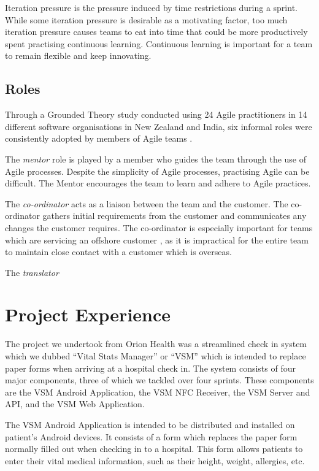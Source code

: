 \documentclass[conference]{IEEEtran}
\begin{document}
Iteration pressure is the pressure induced by time restrictions during a sprint.
While some iteration pressure is desirable as a motivating factor, too much
iteration pressure causes teams to eat into time that could be more productively
spent practising continuous learning. Continuous learning is important for a
team to remain flexible and keep innovating.

\subsection{Roles}

Through a Grounded Theory \cite{strauss1994grounded} study conducted using 24
Agile practitioners in 14 different software organisations in New Zealand and
India, six informal roles were consistently adopted by members of Agile teams
\cite{hoda2010organizing}.

The \emph{mentor} role is played by a member who guides the team through the use
of Agile processes. Despite the simplicity of Agile processes, practising Agile
can be difficult. The Mentor encourages the team to learn and adhere to Agile
practices.

The \emph{co-ordinator} acts as a liaison between the team and the customer. The
co-ordinator gathers initial requirements from the customer and communicates any
changes the customer requires. The co-ordinator is especially important for
teams which are servicing an offshore customer \cite{hoda2010organizing}, as it
is impractical for the entire team to maintain close contact with a customer
which is overseas.

The \emph{translator}



\section{Project Experience}

The project we undertook from Orion Health was a streamlined check in system
which we dubbed ``Vital Stats Manager'' or ``VSM'' which is intended to replace
paper forms when arriving at a hospital check in. The system consists of four
major components, three of which we tackled over four sprints. These components
are the VSM Android Application, the VSM NFC Receiver, the VSM Server and API,
and the VSM Web Application.

The VSM Android Application is intended to be distributed and installed on
patient's Android devices. It consists of a form which replaces the paper form
normally filled out when checking in to a hospital. This form allows patients to
enter their vital medical information, such as their height, weight, allergies,
etc.
\end{document}

